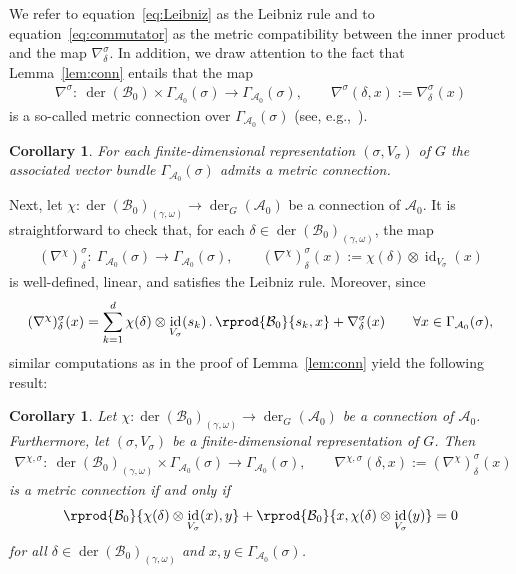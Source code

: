 \documentclass[10pt,a4paper]{amsart}
\numberwithin{equation}{section}
\newtheorem{Corollary}[Theorem]{Corollary}
\newcommand*{\tensor}{\otimes}		%
\DeclareMathOperator{\id}{id}		%
\DeclareMathOperator{\der}{der}
\newcommand*{\acts}{\,.\,}
\newcommand*{\alg}{\mathcal}		%
\newcommand*{\aA}{\alg{A}}			%
\newcommand*{\aB}{\alg{B}} 			%
\begin{document}
We refer to equation~\eqref{eq:Leibniz} as the Leibniz rule and to equation~\eqref{eq:commutator} as the metric compatibility between the inner product and the map $\nabla_\delta^\sigma$.
In addition, we draw attention to the fact that Lemma~\ref{lem:conn} entails that the map
\begin{gather*}
	\nabla^\sigma \colon \ \der(\aB_0) \times \Gamma_{\aA_0}(\sigma) \to \Gamma_{\aA_0}(\sigma), \qquad \nabla^\sigma(\delta,x) := \nabla_\delta^\sigma(x)
\end{gather*}
is a so-called metric connection over $\Gamma_{\aA_0}(\sigma)$ (see, e.g.,~\cite{Jo17,DuVio88}).

\begin{Corollary}
	For each finite-dimensional representation $(\sigma,V_\sigma)$ of $G$ the associated vector bundle $\Gamma_{\aA_0}(\sigma)$ admits a metric connection.
\end{Corollary}

Next, let $\chi\colon \der(\aB_0)_{(\gamma,\omega)} \to \der_G(\aA_0)$ be a connection of $\aA_0$.
It is straightforward to check that, for each $\delta \in \der(\aB_0)_{(\gamma,\omega)}$, the map
\begin{gather*}
	(\nabla^\chi)^\sigma_\delta \colon \ \Gamma_{\aA_0}(\sigma) \to \Gamma_{\aA_0}(\sigma),
	\qquad
	(\nabla^\chi)^\sigma_\delta(x) := \chi(\delta) \tensor \id_{V_\sigma}(x)
\end{gather*}
is well-defined, linear, and satisfies the Leibniz rule.
Moreover, since
\begin{gather*}
	(\nabla^\chi)^\sigma_\delta(x)
	=
	\sum_{k=1}^d \chi(\delta) \tensor \id_{V_\sigma}(s_k)\acts \rprod{\aB_0}{s_k,x} + \nabla^\sigma_\delta(x) \qquad \forall x \in \Gamma_{\aA_0}(\sigma),
\end{gather*}
similar computations as in the proof of Lemma~\ref{lem:conn} yield the following result:

\begin{Corollary}
	Let $\chi\colon \der(\aB_0)_{(\gamma,\omega)} \to \der_G(\aA_0)$ be a connection of $\aA_0$.
Furthermore, let $(\sigma,V_\sigma)$ be a finite-dimensional representation of $G$.
	Then
	\begin{gather*}
\nabla^{\chi,\sigma}\colon \ \der(\aB_0)_{(\gamma,\omega)} \times \Gamma_{\aA_0}(\sigma) \to \Gamma_{\aA_0}(\sigma),
		\qquad
\nabla^{\chi,\sigma}(\delta,x) := (\nabla^\chi)^\sigma_\delta(x)
\end{gather*}
	is a metric connection if and only if
	\begin{gather*}
		\rprod{\aB_0}{\chi(\delta) \tensor \id_{V_\sigma}(x),y} + \rprod{\aB_0}{x,\chi(\delta) \tensor \id_{V_\sigma}(y)} = 0
	\end{gather*}
	for all $\delta \in \der(\aB_0)_{(\gamma,\omega)}$ and $x,y \in \Gamma_{\aA_0}(\sigma)$.
\end{Corollary}
\end{document}

